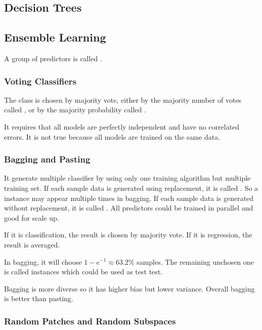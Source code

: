 \subsection{Decision Trees}

\subsection{Ensemble Learning}

A group of predictors is called .

\subsubsection{Voting Classifiers}

The class is chosen by majority vote, either by the majority number of votes called , or by the majority probability called .


It requires that all models are perfectly independent and have no correlated errors. It is not true because all models are trained on the same data.

\subsubsection{Bagging and Pasting}

It generate multiple classifier by using only one training algorithm but multiple training set. If each sample data is generated using replacement, it is called . So a instance may appear multiple times in bagging. If each sample data is generated without replacement, it is called . All predictors could be trained in parallel and good for scale up.

If it is classification, the result is chosen by majority vote. If it is regression, the result is averaged.

In bagging, it will choose $1 - e^{-1} \approx 63.2\%$ samples. The remaining unchosen one is called  instances which could be used as test test.

Bagging is more diverse so it has higher bias but lower variance. Overall bagging is better than pasting.



\subsubsection{Random Patches and Random Subspaces}


